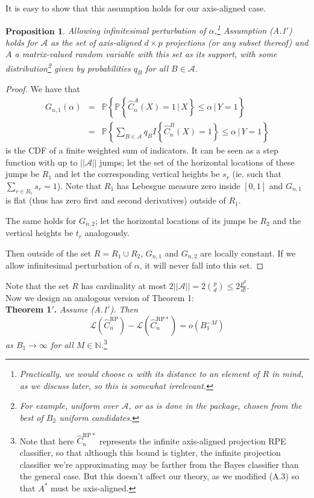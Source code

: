 \documentclass[ejs,preprint]{imsart}
\newtheorem{proposition}{Proposition}
\newcommand\crpnhat{\hat{C}_{n}^{\mathrm{RP}}}
\newcommand\crpnhatstar{\hat{C}_{n}^{\mathrm{RP*}}}
\newcommand\risk{\mathcal{L}}
\begin{document}
It is easy to show that this assumption holds for our axis-aligned
case.

\begin{proposition}
Allowing infinitesimal perturbation of $\alpha$,\footnote{Practically, we would choose $\alpha$ with its distance to an element of $R$ in mind, as we discuss later, so this is somewhat irrelevant.} Assumption (A.1$'$) holds for $\mathcal{A}$ as the set of axis-aligned
$d\times p$ projections (or any subset thereof) and $A$ a matrix-valued
random variable with this set as its support, with some distribution\footnote{For example, uniform over $\mathcal{A}$, or as is done in the package,
chosen from the best of $B_{2}$ uniform candidates.} given by probabilities $q_{B}$ for all $B\in\mathcal{A}$.
\end{proposition}


\begin{proof}
We have that 
\begin{eqnarray*}
G_{n,1}(\alpha) & = & \mathbb{P}\left\{ \mathbb{P}\left\{ \hat{C}_{n}^{A}(X)=1\,\Big|\,X\right\} \leq\alpha\,\Big|\,Y=1\right\} \\
 & = & \mathbb{P}\left\{ \sum_{B\in\mathcal{A}}q_{B}I\left\{ \hat{C}_{n}^{B}(X)=1\right\} \leq\alpha\,\Big|\,Y=1\right\} 
\end{eqnarray*}
 is the CDF of a finite weighted sum of indicators. It can be seen
as a step function with up to $||\mathcal{A}||$ jumps; let the set of the
horizontal locations of these jumps be $R_{1}$ and let the corresponding
vertical heights be $s_{r}$ (ie. such that $\sum_{r\in R_{1}}s_{r}=1$).
Note that $R_{1}$ has Lebesgue measure zero inside $[0,1]$ and $G_{n,1}$
is flat (thus has zero first and second derivatives) outside of $R_{1}$.

The same holds for $G_{n,2}$; let the horizontal locations of its
jumps be $R_{2}$ and the vertical heights be $t_{r}$ analogously.

Then outside of the set $R=R_{1}\cup R_{2}$, $G_{n,1}$ and $G_{n,2}$ are locally constant. If we allow infinitesimal perturbation of $\alpha$, it will never fall into this set.
\end{proof}


Note that the set $R$ has cardinality at most $2||\mathcal{A}||=2\binom{p}{d}\leq2\frac{p^{d}}{d!}$.\\


Now we design an analogous version of Theorem 1:\\


\noindent \textbf{Theorem 1$'$.} \emph{Assume (A.1$'$). Then 
\[
\risk\left(\crpnhat\right)-\risk\left(\crpnhatstar\right)=o\left(B_{1}^{-M}\right)
\]
 as $B_{1}\to\infty$ for all $M\in\mathbb{N}$.}\footnote{\noindent Note that here $\crpnhatstar$ represents the infinite axis-aligned
projection RPE classifier, so that although this bound is tighter,
the infinite projection classifier we're approximating may be farther
from the Bayes classifier than the general case. But this doesn't affect our theory, as
we modified (A.3) so that $A^{*}$ must be axis-aligned.}
\end{document}
